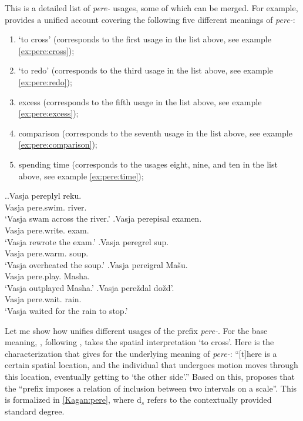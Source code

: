 This is a detailed list of \textit{pere-} usages, some of which can be merged. For example, \citet[119--125]{Kagan:book} provides a unified account covering the following five different meanings of \textit{pere-}: 
\begin{enumerate}
\item `to cross' (corresponds to the first usage in the list above, see example \ref{ex:pere:cross});
\item `to redo' (corresponds to the third usage in the list above, see example \ref{ex:pere:redo});
\item excess (corresponds to the fifth usage in the list above, see example \ref{ex:pere:excess});
\item comparison (corresponds to the seventh usage in the list above, see example \ref{ex:pere:comparison});
\item spending time (corresponds to the usages eight, nine, and ten in the list above, see example \ref{ex:pere:time});
\end{enumerate}

\ex.\label{ex:pere}\ag.\label{ex:pere:cross}Vasja pereplyl reku.\\
Vasja pere.swim. river.\\
\trans `Vasja swam across the river.'
\bg.\label{ex:pere:redo}Vasja perepisal examen.\\
Vasja pere.write. exam.\\
\trans `Vasja rewrote the exam.'
\bg.\label{ex:pere:excess}Vasja peregrel sup.\\
Vasja pere.warm. soup.\\
\trans `Vasja overheated the soup.'
\bg.\label{ex:pere:comparison}Vasja pereigral Ma\v{s}u.\\
Vasja pere.play. Masha.\\
\trans `Vasja outplayed Masha.'
\bg.\label{ex:pere:time}Vasja pere\v{z}dal do\v{z}d'.\\
Vasja pere.wait. rain.\\
\trans `Vasja waited for the rain to stop.'

Let me show how \citet{Kagan:book} unifies different usages of the prefix \textit{pere-}. For the base meaning, \citet[120--121]{Kagan:book}, following \citet{Janda:88}, takes the spatial interpretation `to cross'. Here is the characterization that \citet[121]{Kagan:book} gives for the underlying meaning of \textit{pere-}: ``[t]here is a certain spatial location, and the individual that undergoes motion moves through this location, eventually getting to `the other side'.'' Based on this, \citet[122]{Kagan:book} proposes that the ``prefix imposes a relation of inclusion between two intervals on a scale''. This is formalized in \ref{Kagan:pere}, where d$_s$ refers to the contextually provided standard degree.

